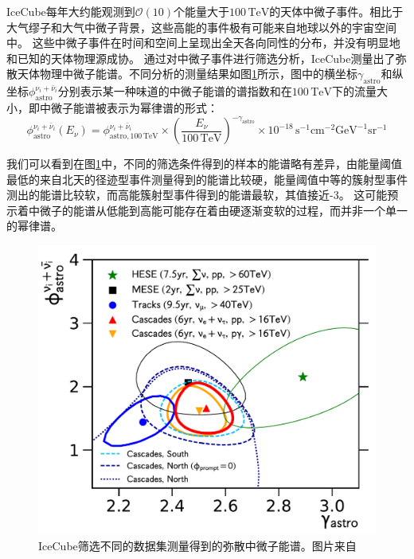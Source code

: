 IceCube每年大约能观测到$\mathcal{O}(10)$个能量大于$100\,\mathrm{TeV}$的天体中微子事件。相比于大气缪子和大气中微子背景，这些高能的事件极有可能来自地球以外的宇宙空间中。
这些中微子事件在时间和空间上呈现出全天各向同性的分布，并没有明显地和已知的天体物理源成协。
通过对中微子事件进行筛选分析，IceCube测量出了弥散天体物理中微子能谱\cite{IceCube_6yr_cascade_spectrum:2020, IceCube_HESE:2020, IceCube_MESE:2014, IceCube_diffse_muon:2021, IceCube_starting_track:2021b}。不同分析的测量结果如图\ref{fig:IceCube_diffuse_spectrum}所示，图中的横坐标$\gamma_\mathrm{astro}$和纵坐标$\phi^{\nu_i+\bar{\nu}_i}_\mathrm{astro}$分别表示某一种味道的中微子能谱的谱指数和在$100\,\mathrm{TeV}$下的流量大小，即中微子能谱被表示为幂律谱的形式：
\begin{equation}
    \phi^{\nu_i+\bar{\nu}_i}_\mathrm{astro}(E_\nu) = \phi^{\nu_i+\bar{\nu}_i}_\mathrm{astro, 100\,TeV} \times \left( \frac{E_\nu}{100\,\mathrm{TeV}} \right)^{-\gamma_\mathrm{astro}} \times 10^{-18} \, \mathrm{s^{-1} cm^{-2} GeV^{-1} sr^{-1}}
    \label{eq:diffse_nu_flux}
\end{equation}

我们可以看到在图\ref{fig:IceCube_diffuse_spectrum}中，不同的筛选条件得到的样本的能谱略有差异，由能量阈值最低的来自北天的径迹型事件\cite{IceCube_diffse_muon:2021}测量得到的能谱比较硬，能量阈值中等的簇射型事件\cite{IceCube_MESE:2014, IceCube_6yr_cascade_spectrum:2020}测出的能谱比较软，而高能簇射型事件\cite{IceCube_HESE:2020}得到的能谱最软，其值接近-3。
这可能预示着中微子的能谱从低能到高能可能存在着由硬逐渐变软的过程，而并非一个单一的幂律谱。

\begin{figure}[htbp]
    \centering
    \includegraphics[width=0.65\linewidth]{img/IceCube_diffuse_spectrum.pdf}
    \caption{IceCube筛选不同的数据集测量得到的弥散中微子能谱。图片来自\parencite{IceCube_6yr_cascade_spectrum:2020}}
    \label{fig:IceCube_diffuse_spectrum}
\end{figure}

